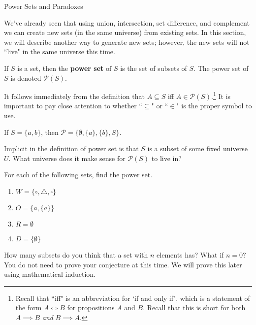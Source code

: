 \begin{section}{Power Sets and Paradoxes}

We've already seen that using union, intersection, set difference, and complement we can create new sets (in the same universe) from existing sets.  In this section, we will describe another way to generate new sets; however, the new sets will not ``live" in the same universe this time.

\begin{definition}
If $S$ is a set, then the \textbf{power set} of $S$ is the set of subsets of $S$.  The power set of $S$ is denoted $\mathcal{P}(S)$.
\end{definition}

\begin{remark}
It follows immediately from the definition that $A\subseteq S$ iff $A\in\mathcal{P}(S)$.\footnote{Recall that ``iff" is an abbreviation for `if and only if", which is a statement of the form $A\iff B$ for propositions $A$ and $B$.  Recall that this is short for both $A\implies B$ \emph{and} $B\implies A$.}  It is important to pay close attention to whether ``$\subseteq$" or ``$\in$" is the proper symbol to use.
\end{remark}

\begin{example}
If $S=\{a,b\}$, then $\mathcal{P}=\{\emptyset, \{a\}, \{b\}, S\}$.
\end{example}

\begin{question}
Implicit in the definition of power set is that $S$ is a subset of some fixed universe $U$.  What universe does it make sense for $\mathcal{P}(S)$ to live in?
\end{question}

\begin{exercise}
For each of the following sets, find the power set.
\begin{enumerate}
\item $W=\{\circ, \triangle, \square\}$
\item $O=\{a,\{a\}\}$
\item $R=\emptyset$
\item $D=\{\emptyset\}$
\end{enumerate}
\end{exercise}

\begin{conjecture}
How many subsets do you think that a set with $n$ elements has?  What if $n=0$?  You do not need to prove your conjecture at this time.  We will prove this later using mathematical induction.
\end{conjecture}


\end{section}

